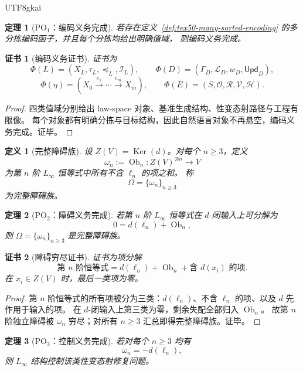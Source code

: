 \documentclass[12pt]{article}
\newtheorem{definition}{定义}[section]
\newtheorem{theorem}{定理}[section]
\newtheorem{Certificate}{证书}[section]
\newcommand{\Linfty}{\ensuremath{L_\infty}}
\newcommand{\Layer}{\ell}
\newcommand{\Ob}{\operatorname{Ob}}
\newcommand{\Ker}{\operatorname{Ker}}
\begin{document}
\begin{CJK*}{UTF8}{gkai}
\begin{theorem}[\(\mathrm{PO}_1\)：编码义务完成]
\label{thm:tex50-po1}
若存在定义~\ref{def:tex50-many-sorted-encoding} 的多分拣编码函子，并且每个分拣均给出明确值域，
则编码义务完成。
\end{theorem}

\begin{Certificate}[编码义务证书]
证书为
\[
  \Phi(L)=(X_L,\tau_L,\preceq_L,\mathcal I_L),
  \qquad
  \Phi(D)=(\Gamma_D,\mathcal L_D,w_D,\mathsf{Upd}_D),
\]
\[
  \Phi(\eta)=
  (X_0\xrightarrow{e_1}\cdots\xrightarrow{e_m}X_m),
  \qquad
  \Phi(E)=(S,\mathcal O,\mathcal R,\mathcal V,\mathcal H).
\]
\end{Certificate}

\begin{proof}
四类值域分别给出 law-space 对象、基准生成结构、性变态射路径与工程有限像。
每个对象都有明确分拣与目标结构，因此自然语言对象不再悬空，编码义务完成。证毕。
\end{proof}

\begin{definition}[完整障碍族]
\label{def:tex50-complete-obstruction-family}
设 $Z(V)=\Ker(d)$。对每个 $n\ge3$，定义
\[
  \omega_n:=\Ob_n:Z(V)^{\otimes n}\to V
\]
为第 $n$ 阶 \Linfty{} 恒等式中所有不含 $\Layer_n$ 的项之和。
称
\[
  \Omega=\{\omega_n\}_{n\ge3}
\]
为完整障碍族。
\end{definition}

\begin{theorem}[\(\mathrm{PO}_2\)：障碍义务完成]
\label{thm:tex50-po2}
若第 $n$ 阶 \Linfty{} 恒等式在 $d$-闭输入上可分解为
\[
  0=d(\Layer_n)+\Ob_n,
\]
则 $\Omega=\{\omega_n\}_{n\ge3}$ 是完整障碍族。
\end{theorem}

\begin{Certificate}[障碍穷尽证书]
证书为项分解
\[
  \text{第 }n\text{ 阶恒等式}
  =
  d(\Layer_n)
  +\Ob_n
  +\text{含 }d(x_i)\text{ 的项}.
\]
在 $x_i\in Z(V)$ 时，最后一类项为零。
\end{Certificate}

\begin{proof}
第 $n$ 阶恒等式的所有项被分为三类：$d(\Layer_n)$、不含 $\Layer_n$ 的项、以及 $d$ 先作用于输入的项。
在 $d$-闭输入上第三类为零，剩余失配全部归入 $\Ob_n$。
故第 $n$ 阶独立障碍被 $\omega_n$ 穷尽；对所有 $n\ge3$ 汇总即得完整障碍族。证毕。
\end{proof}

\begin{theorem}[\(\mathrm{PO}_3\)：控制义务完成]
\label{thm:tex50-po3}
若对每个 $n\ge3$ 均有
\[
  \omega_n=-d(\Layer_n),
\]
则 \Linfty{} 结构控制该类性变态射修复问题。
\end{theorem}


\end{CJK*}
\end{document}
